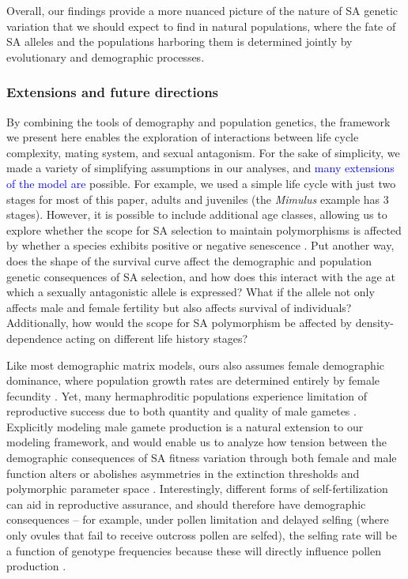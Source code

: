 \documentclass[11pt]{article}
\begin{document}
Overall, our findings provide a more nuanced picture of the nature of SA genetic variation that we should expect to find in natural populations, where the fate of SA alleles and the populations harboring them is determined jointly by evolutionary and demographic processes.


\subsubsection*{Extensions and future directions}

By combining the tools of demography and population genetics, the framework we present here enables the exploration of interactions between life cycle complexity, mating system, and sexual antagonism. For the sake of simplicity, we made a variety of simplifying assumptions in our analyses, and \textcolor{blue}{many extensions of the model are} possible. For example, we used a simple life cycle with just two stages for most of this paper, adults and juveniles (the \textit{Mimulus} example has $3$ stages). However, it is possible to include additional age classes, allowing us to explore whether the scope for SA selection to maintain polymorphisms is affected by whether a species exhibits positive or negative senescence \citep{jones2014diversity}. Put another way, does the shape of the survival curve affect the demographic and population genetic consequences of SA selection, and how does this interact with the age at which a sexually antagonistic allele is expressed? What if the allele not only affects male and female fertility but also affects survival of individuals? Additionally, how would the scope for SA polymorphism be affected by density-dependence acting on different life history stages?

Like most demographic matrix models, ours also assumes female demographic dominance, where population growth rates are determined entirely by female fecundity \citep{pollard1975mathematical,Caswell2001,iannelli2005gender}. Yet, many hermaphroditic populations experience limitation of reproductive success due to both quantity and quality of male gametes \citep[e.g.,][]{Yund2000,AizenHarder2007, Harder2016}. Explicitly modeling male gamete production is a natural extension to our modeling framework, and would enable us to analyze how tension between the demographic consequences of SA fitness variation through both female and male function alters or abolishes asymmetries in the extinction thresholds and polymorphic parameter space \citep[e.g.,][]{Tazzyman2015}.  Interestingly, different forms of self-fertilization can aid in reproductive assurance, and should therefore have demographic consequences -- for example, under pollen limitation and delayed selfing (where only ovules that fail to receive outcross pollen are selfed), the selfing rate will be a function of genotype frequencies because these will directly influence pollen production \citep{HarderBarrett2006}.
\end{document}
